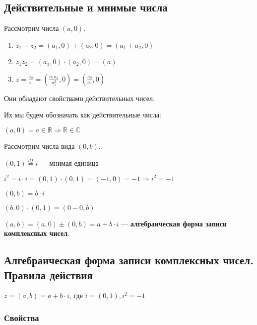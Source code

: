 \documentclass{article}
\begin{document}
    \subsection{Действительные и мнимые числа}

    Рассмотрим числа \( (a, 0) \).

    \begin{enumerate}
        \item \( z_1 \pm  z_2 = (a_1, 0) \pm (a_2, 0) = (a_1 \pm a_2, 0) \)
        \item \(z_1z_2 = (a_1, 0)\cdot(a_2, 0) = (a)\)
        \item \(z = \frac{z_2}{z_1} = (\frac{a_1a_2}{a_1^2}, 0) = (\frac{a_2}{a_1}, 0) \)
    \end{enumerate}

    Они обладают свойствами действительных чисел.

    Их мы будем обозначать как действительные числа: 

    \( (a, 0) = a \in \mathbb{R} \Rightarrow \mathbb{R} \in \mathbb{C} \)

    Рассмотрим числа вида \((0, b)\).

    \((0, 1) \stackrel{df}{=} i\) --- мнимая единица

    \(i^2 = i\cdot i = (0,1)\cdot(0, 1) = (-1, 0) = -1 \Rightarrow i^2 = -1\)

    \( (0, b) = b \cdot i \)

    \( (b, 0) \cdot (0, 1) = (0 - 0, b) \)

    \( (a, b) = (a, 0) \pm (0, b) = a + b \cdot i \) --- \textbf{алгебраическая форма записи комплексных чисел}.

    \subsection{Алгебраическая форма записи комплексных чисел. Правила действия}

    \(z = (a, b) = a + b \cdot i \), где \( i = (0, 1), i^2 = -1 \)

    \subsubsection{Свойства}
    
\end{document}

